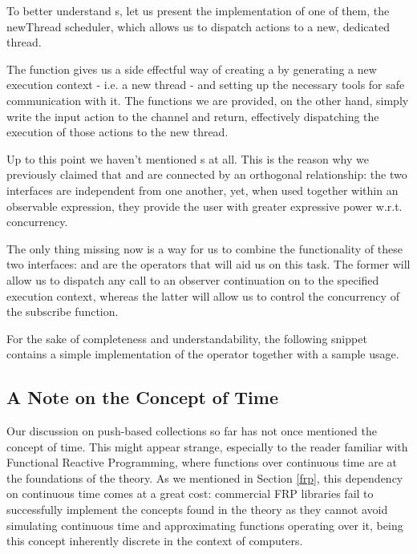 To better understand s, let us present the implementation of one of them, the newThread scheduler, which allows us to dispatch actions to a new, dedicated thread.


The  function gives us a side effectful way of creating a  by generating a new execution context - i.e. a new thread - and setting up the necessary tools for safe communication with it. The  functions we are provided, on the other hand, simply write the input  action to the channel and return, effectively dispatching the execution of those actions to the new thread. 

Up to this point we haven't mentioned s at all. This is the reason why we previously claimed that  and  are connected by an orthogonal relationship: the two interfaces are independent from one another, yet, when used together within an observable expression, they provide the user with greater expressive power w.r.t. concurrency. 

The only thing missing now is a way for us to combine the functionality of these two interfaces:  and  are the operators that will aid us on this task. The former will allow us to dispatch any call to an observer continuation on to the specified execution context, whereas the latter will allow us to control the concurrency of the  subscribe function.

For the sake of completeness and understandability, the following snippet contains a simple implementation of the  operator together with a sample usage.



\subsection{A Note on the Concept of Time}

Our discussion on push-based collections so far has not once mentioned the concept of time. This might appear strange, especially to the reader familiar with Functional Reactive Programming, where functions over continuous time are at the foundations of the theory. As we mentioned in Section \ref{frp}, this dependency on continuous time comes at a great cost: commercial FRP libraries fail to successfully implement the concepts found in the theory as they cannot avoid simulating continuous time and approximating functions operating over it, being this concept inherently discrete in the context of computers.


